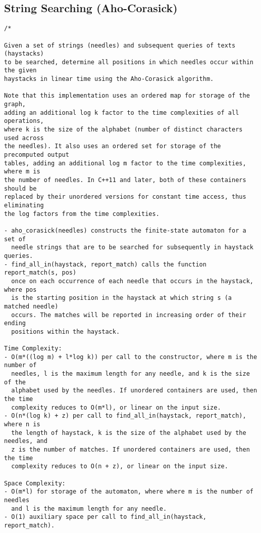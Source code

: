\subsection{String Searching (Aho-Corasick)}
\begin{lstlisting}
/*

Given a set of strings (needles) and subsequent queries of texts (haystacks)
to be searched, determine all positions in which needles occur within the given
haystacks in linear time using the Aho-Corasick algorithm.

Note that this implementation uses an ordered map for storage of the graph,
adding an additional log k factor to the time complexities of all operations,
where k is the size of the alphabet (number of distinct characters used across
the needles). It also uses an ordered set for storage of the precomputed output
tables, adding an additional log m factor to the time complexities, where m is
the number of needles. In C++11 and later, both of these containers should be
replaced by their unordered versions for constant time access, thus eliminating
the log factors from the time complexities.

- aho_corasick(needles) constructs the finite-state automaton for a set of
  needle strings that are to be searched for subsequently in haystack queries.
- find_all_in(haystack, report_match) calls the function report_match(s, pos)
  once on each occurrence of each needle that occurs in the haystack, where pos
  is the starting position in the haystack at which string s (a matched needle)
  occurs. The matches will be reported in increasing order of their ending
  positions within the haystack.

Time Complexity:
- O(m*((log m) + l*log k)) per call to the constructor, where m is the number of
  needles, l is the maximum length for any needle, and k is the size of the
  alphabet used by the needles. If unordered containers are used, then the time
  complexity reduces to O(m*l), or linear on the input size.
- O(n*(log k) + z) per call to find_all_in(haystack, report_match), where n is
  the length of haystack, k is the size of the alphabet used by the needles, and
  z is the number of matches. If unordered containers are used, then the time
  complexity reduces to O(n + z), or linear on the input size.

Space Complexity:
- O(m*l) for storage of the automaton, where where m is the number of needles
  and l is the maximum length for any needle.
- O(1) auxiliary space per call to find_all_in(haystack, report_match).


\end{lstlisting}
